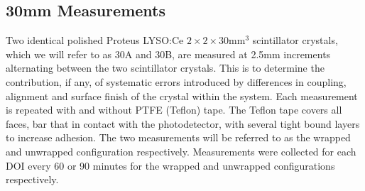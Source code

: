 \subsection{30mm Measurements}
Two identical polished Proteus LYSO:Ce $2\times2\times30$mm$^3$ scintillator crystals, which we will refer to as 30A and 30B, are measured at 2.5mm increments alternating between the two scintillator crystals. This is to determine the contribution, if any, of systematic errors introduced by differences in coupling, alignment and surface finish of the crystal within the system. Each measurement is repeated with and without PTFE (Teflon) tape. The Teflon tape covers all faces, bar that in contact with the photodetector, with several tight bound layers to increase adhesion. The two measurements will be referred to as the wrapped and unwrapped configuration respectively. Measurements were collected for each DOI every 60 or 90 minutes for the wrapped and unwrapped configurations respectively. 

